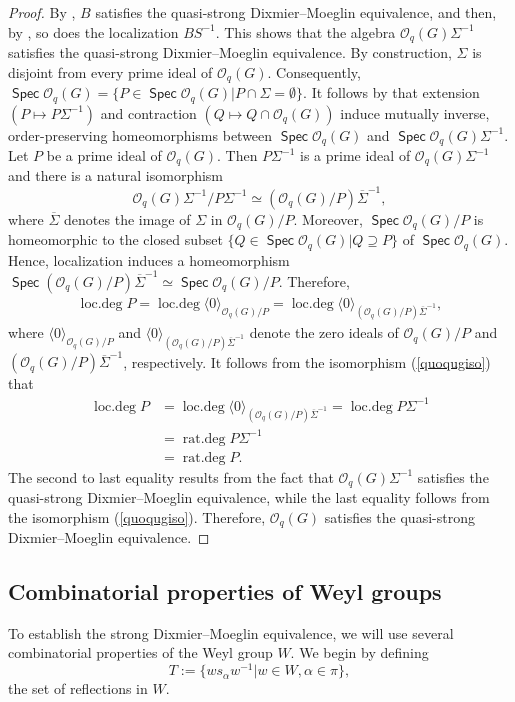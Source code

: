 \documentclass[11pt]{article}
\theoremstyle{definition}
\numberwithin{equation}{section}
\newcommand{\qu}{\mathcal{O}}
\DeclareMathOperator{\rdeg}{\mathrm{rat.deg}}
\DeclareMathOperator{\ldeg}{\mathrm{loc.deg}}
\DeclareMathOperator{\spec}{\mathsf{Spec}}
\begin{document}
\begin{proof}
		By \cite[Theorem 7.1]{BLN17}, $B$ satisfies the quasi-strong Dixmier--Moeglin equivalence, and then, by \cite[Lemma 2.3]{BLN17}, so does the localization $BS^{-1}$. This shows that  the algebra $\qu_q(G)\Sigma^{-1}$ satisfies the quasi-strong Dixmier--Moeglin equivalence. By construction, $\Sigma$ is disjoint from every prime ideal of $\qu_q(G)$. Consequently, $\spec\qu_q(G)= \{P\in\spec\qu_q(G)| P\cap \Sigma= \emptyset\}$. It follows by \cite[Theorem 10.20]{GW04} that  extension $(P\mapsto P\Sigma^{-1})$ and contraction $(Q\mapsto Q\cap\qu_q(G))$ induce mutually inverse, order-preserving homeomorphisms between $\spec\qu_q(G)$ and $\spec\qu_q(G)\Sigma^{-1}$. Let $P$ be a prime ideal of $\qu_q(G)$. Then $P\Sigma^{-1}$ is a prime ideal of $\qu_q(G)\Sigma^{-1}$ and there is a natural isomorphism
		\begin{equation}\label{quoqugiso}
			\qu_q(G)\Sigma^{-1}/P\Sigma^{-1}\simeq(\qu_q(G)/P)\overline{\Sigma}^{-1}, 
		\end{equation}
		where $\overline{\Sigma}$ denotes the image of $\Sigma$ in $\qu_q(G)/P$. Moreover, $\spec\qu_q(G)/P$ is homeomorphic to the closed subset $\{Q\in\spec\qu_q(G)| Q\supseteq P\}$ of $\spec\qu_q(G)$. Hence, localization induces a homeomorphism $\spec(\qu_q(G)/P)\overline{\Sigma}^{-1}\simeq\spec\qu_q(G)/P$. Therefore,
		\begin{align*}
			\ldeg P= \ldeg\langle 0 \rangle_{\qu_q(G)/P}= \ldeg\langle 0\rangle_{(\qu_q(G)/P)\overline{\Sigma}^{-1}},
		\end{align*}
		where $\langle 0 \rangle_{\qu_q(G)/P}$ and $\langle 0 \rangle_{(\qu_q(G)/P)\overline{\Sigma}^{-1}}$ denote the zero ideals of $\qu_q(G)/P$ and $(\qu_q(G)/P)\overline{\Sigma}^{-1}$, respectively. It follows from the isomorphism (\ref{quoqugiso}) that \begin{align*}
			\ldeg P&= \ldeg\langle 0 \rangle_{(\qu_q(G)/P)\overline{\Sigma}^{-1}}= \ldeg P\Sigma^{-1}\\
			&= \rdeg P\Sigma^{-1}\\
			&= \rdeg P.
		\end{align*}
		The second to last equality results from the fact that $\qu_q(G) \Sigma^{-1}$ satisfies the quasi-strong Dixmier--Moeglin equivalence, while the last equality follows from the isomorphism (\ref{quoqugiso}). Therefore, $\qu_q(G)$ satisfies the quasi-strong Dixmier--Moeglin equivalence.
	\end{proof}
	
	
	\subsection{Combinatorial properties of Weyl groups}\label{combWeylgroup}
	To establish the strong Dixmier--Moeglin equivalence, we will use
	several combinatorial properties of the Weyl group $W$. We begin by	defining
	$$T:= \{ws_{\alpha}w^{-1}|  w\in W, \alpha\in\pi\},$$
	the set of reflections in $W$. 
	
\end{document}
